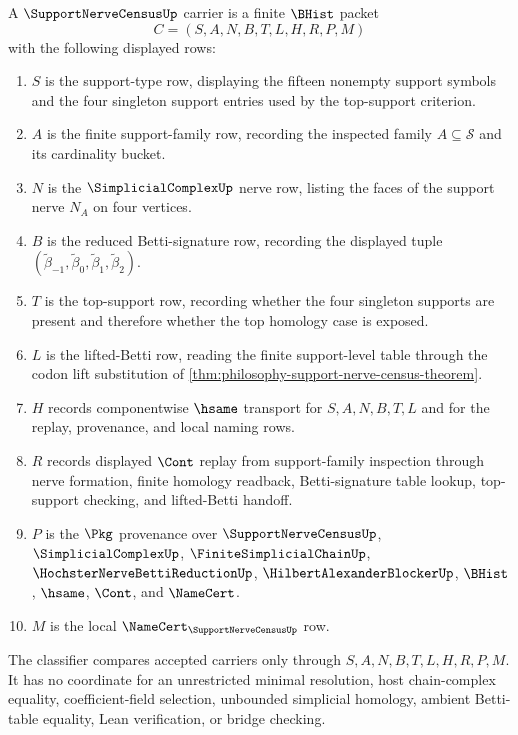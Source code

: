\begin{definition}
\label{def:support-nerve-census-carrier}
A $\SupportNerveCensusUp$ carrier is a finite $\BHist$ packet
$$
C=(S,A,N,B,T,L,H,R,P,M)
$$
with the following displayed rows:
\begin{enumerate}
\item $S$ is the support-type row, displaying the fifteen nonempty support symbols and the four singleton support entries used by the top-support criterion.
\item $A$ is the finite support-family row, recording the inspected family $A\subseteq\mathcal{S}$ and its cardinality bucket.
\item $N$ is the $\SimplicialComplexUp$ nerve row, listing the faces of the support nerve $N_A$ on four vertices.
\item $B$ is the reduced Betti-signature row, recording the displayed tuple $(\widetilde{\beta}_{-1},\widetilde{\beta}_{0},\widetilde{\beta}_{1},\widetilde{\beta}_{2})$.
\item $T$ is the top-support row, recording whether the four singleton supports are present and therefore whether the top homology case is exposed.
\item $L$ is the lifted-Betti row, reading the finite support-level table through the codon lift substitution of \autoref{thm:philosophy-support-nerve-census-theorem}.
\item $H$ records componentwise $\hsame$ transport for $S,A,N,B,T,L$ and for the replay, provenance, and local naming rows.
\item $R$ records displayed $\Cont$ replay from support-family inspection through nerve formation, finite homology readback, Betti-signature table lookup, top-support checking, and lifted-Betti handoff.
\item $P$ is the $\Pkg$ provenance over $\SupportNerveCensusUp$, $\SimplicialComplexUp$, $\FiniteSimplicialChainUp$, $\HochsterNerveBettiReductionUp$, $\HilbertAlexanderBlockerUp$, $\BHist$, $\hsame$, $\Cont$, and $\NameCert$.
\item $M$ is the local $\NameCert_{\SupportNerveCensusUp}$ row.
\end{enumerate}
The classifier compares accepted carriers only through $S,A,N,B,T,L,H,R,P,M$. It has no coordinate for an unrestricted minimal resolution, host chain-complex equality, coefficient-field selection, unbounded simplicial homology, ambient Betti-table equality, Lean verification, or bridge checking.
\end{definition}


